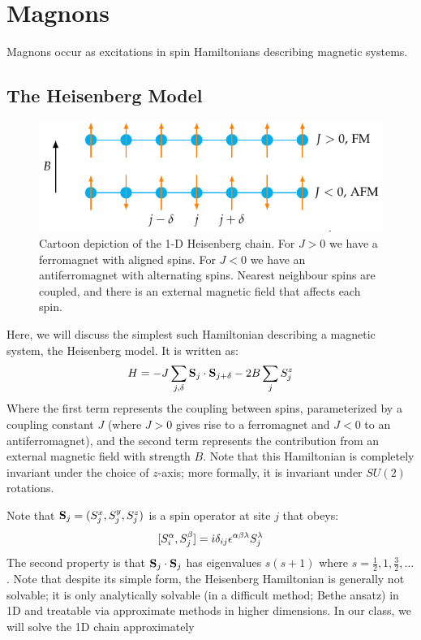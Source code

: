\section{Magnons}

Magnons occur as excitations in spin Hamiltonians describing magnetic systems.

\subsection{The Heisenberg Model}

\begin{figure}[htbp]
    \centering
    \includegraphics[]{Images/fig-FMAFMHeisenbergchain.pdf}
    \caption{Cartoon depiction of the 1-D Heisenberg chain. For $J > 0$ we have a ferromagnet with aligned spins. For $J < 0$ we have an antiferromagnet with alternating spins. Nearest neighbour spins are coupled, and there is an external magnetic field that affects each spin.}
    \label{fig-FMAFMHeisenbergchain}
\end{figure}

Here, we will discuss the simplest such Hamiltonian describing a magnetic system, the Heisenberg model. It is written as:
\begin{equation}
    H = -J\sum_{j, \delta}\mathbf{S}_j \cdot \mathbf{S}_{j+\delta} - 2B\sum_j S_j^z
\end{equation}
Where the first term represents the coupling between spins, parameterized by a coupling constant $J$ (where $J > 0$ gives rise to a ferromagnet and $J < 0$ to an antiferromagnet), and the second term represents the contribution from an external magnetic field with strength $B$. Note that this Hamiltonian is completely invariant under the choice of $z$-axis; more formally, it is invariant under $SU(2)$ rotations.

Note that $\mathbf{S}_j = (S_j^x, S_j^y, S_j^z)$ is a spin operator at site $j$ that obeys:
\begin{equation}\label{eq-spinalgebra}
    [S^\alpha_i, S^\beta_j] = i\delta_{ij}\epsilon^{\alpha\beta\lambda}S^\lambda_j
\end{equation}
The second property is that $\mathbf{S}_j \cdot \mathbf{S}_j$ has eigenvalues $s(s+1)$ where $s = \frac{1}{2},1,\frac{3}{2},\ldots$. Note that despite its simple form, the Heisenberg Hamiltonian is generally not solvable; it is only analytically solvable (in a difficult method; Bethe ansatz) in 1D and treatable via approximate methods in higher dimensions. In our class, we will solve the 1D chain approximately

